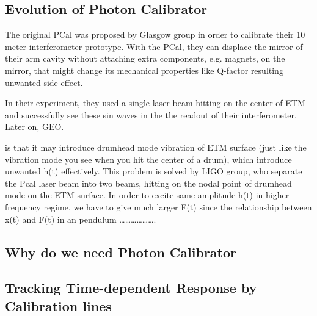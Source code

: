 \subsection{Evolution of Photon Calibrator}


The original PCal was proposed by Glasgow group \cite{pcal:clubley2001} in order to calibrate their 10 meter interferometer prototype. With the PCal, they can displace the mirror of their arm cavity without attaching extra components, e.g. magnets, on the mirror, that might change its mechanical properties like Q-factor resulting unwanted side-effect.

In their experiment, they used a single laser beam hitting on the center of ETM and successfully see these sin waves in the the readout of their interferometer. Later on, GEO. 

is that it may introduce drumhead mode vibration of ETM surface (just like the vibration mode you see when you hit the center of a drum), which introduce unwanted h(t) effectively. This problem is solved by LIGO group\cite{pcal:karki2016}, who separate the Pcal laser beam into two beams, hitting on the nodal point of drumhead mode on the ETM surface\cite{pcal:Daveloza2012}.  
In order to excite same amplitude h(t) in higher frequency regime, we have to give much larger F(t) since the relationship between x(t) and F(t) in an pendulum ……………….


\subsection{Why do we need Photon Calibrator}
\subsection{Tracking Time-dependent Response by Calibration lines}
